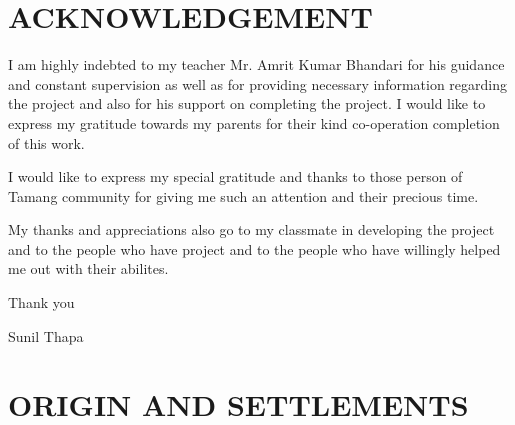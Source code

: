 \documentclass[a4paper,14pt]{article}
\begin{document}
\begin{flushleft}
	\section*{ACKNOWLEDGEMENT}
	I am highly indebted to my teacher Mr. Amrit Kumar Bhandari for his guidance and constant supervision as well as for providing necessary information regarding the project and also for his support on completing the project. I would like to express my gratitude towards my parents for their kind co-operation completion of this work.
	\vskip0.5cm


	I would like to express my special gratitude and thanks to those person of Tamang community for giving me such an attention and their precious time.
	\vskip0.5cm

	My thanks and appreciations also go to my classmate in developing the project and to the people who have project  and to the people who have willingly helped me out with their abilites.
	\vskip0.5cm

	Thank you





	\begin{flushright}
		Sunil Thapa
	\end{flushright}


	\newpage
	\tableofcontents

	\newpage

	\section{ORIGIN AND SETTLEMENTS}


\end{flushleft}
\end{document}

